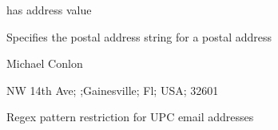 \documentclass[letterpaper,10pt,english]{sphinxmanual}
\begin{document}
\begin{sphinxShadowBox}

\sphinxAtStartPar
has address value
\end{sphinxShadowBox}

\begin{sphinxShadowBox}

\sphinxAtStartPar
{\hyperref[\detokenize{doc-OBI_0002815::doc}]{}}
\end{sphinxShadowBox}

\begin{sphinxShadowBox}

\sphinxAtStartPar
Specifies the postal address string for a postal address
\end{sphinxShadowBox}

\begin{sphinxShadowBox}

\sphinxAtStartPar
Michael Conlon 
\end{sphinxShadowBox}

\begin{sphinxShadowBox}

\sphinxAtStartPar
{\hyperref[\detokenize{doc-IAO_0000422::doc}]{}}
\end{sphinxShadowBox}

\begin{sphinxShadowBox}

\sphinxAtStartPar
{}
\end{sphinxShadowBox}

\begin{sphinxShadowBox}

 NW 14th Ave; ;Gainesville; Fl; USA; 32601
\end{sphinxShadowBox}

\begin{sphinxShadowBox}

\sphinxAtStartPar
Regex pattern restriction for UPC email addresses
\end{sphinxShadowBox}
\end{document}
